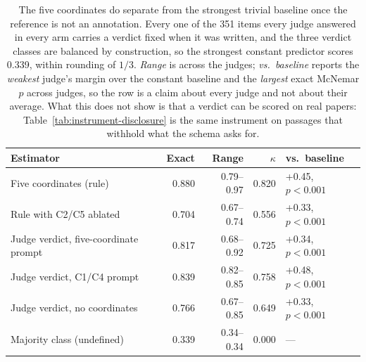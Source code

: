 \begin{table}[t]
\centering\scriptsize
\setlength{\tabcolsep}{3pt}
\begin{tabular}{@{}lrrrl@{}}
\toprule
Estimator & Exact & Range & $\kappa$ & vs.\ baseline \\
\midrule
Five coordinates (rule) & 0.880 & 0.79--0.97 & 0.820 & +0.45, $p<0.001$ \\
Rule with C2/C5 ablated & 0.704 & 0.67--0.74 & 0.556 & +0.33, $p<0.001$ \\
Judge verdict, five-coordinate prompt & 0.817 & 0.68--0.92 & 0.725 & +0.34, $p<0.001$ \\
Judge verdict, C1/C4 prompt & 0.839 & 0.82--0.85 & 0.758 & +0.48, $p<0.001$ \\
Judge verdict, no coordinates & 0.766 & 0.67--0.85 & 0.649 & +0.33, $p<0.001$ \\
Majority class (undefined) & 0.339 & 0.34--0.34 & 0.000 & --- \\
\bottomrule
\end{tabular}
\caption{The five coordinates do separate from the strongest trivial baseline once the reference is not an annotation. Every one of the 351 items every judge answered in every arm carries a verdict fixed when it was written, and the three verdict classes are balanced by construction, so the strongest constant predictor scores 0.339, within rounding of $1/3$. \emph{Range} is across the judges; \emph{vs.\ baseline} reports the \emph{weakest} judge's margin over the constant baseline and the \emph{largest} exact McNemar $p$ across judges, so the row is a claim about every judge and not about their average. What this does not show is that a verdict can be scored on real papers: Table~\ref{tab:instrument-disclosure} is the same instrument on passages that withhold what the schema asks for.}
\label{tab:instrument-baselines}
\end{table}
